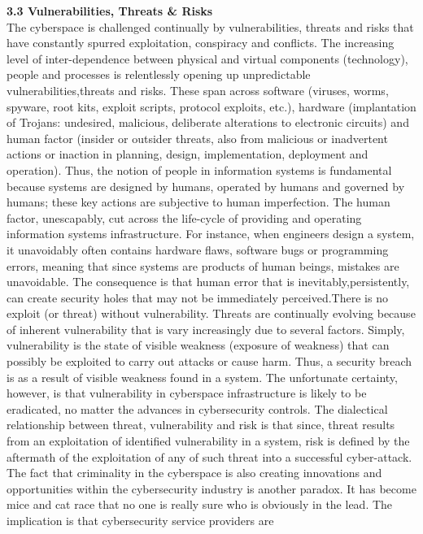 \documentclass[11pt,a4paper]{article}
\begin{document}
	
	
\textbf{ 3.3 Vulnerabilities, Threats & Risks}\\
	
	The cyberspace is challenged continually by vulnerabilities, threats and risks that have constantly spurred exploitation, conspiracy and conflicts. The increasing level of inter-dependence between physical and 
virtual components (technology), people and processes is relentlessly opening up unpredictable vulnerabilities,threats and risks. These span across software (viruses, worms, spyware, root kits, exploit scripts, protocol 
exploits, etc.), hardware (implantation of Trojans: undesired, malicious, deliberate alterations to electronic circuits) and human factor (insider or outsider threats, also from malicious or inadvertent actions or inaction in 
planning, design, implementation, deployment and operation). Thus, the notion of people in information systems is fundamental because systems are designed by humans, operated by humans and governed by humans; these key actions are subjective to human imperfection. The human factor, unescapably, cut across the life-cycle of providing and operating information systems infrastructure. For instance, when engineers design a system, it unavoidably often contains hardware flaws, software bugs or programming errors, meaning that since systems 
are products of human beings, mistakes are unavoidable. The consequence is that human error that is inevitably,persistently, can create security holes that may not be immediately perceived.There is no exploit (or threat) without vulnerability. Threats are continually evolving because of inherent vulnerability that is vary increasingly due to several factors. Simply, vulnerability is the state of visible weakness (exposure of weakness) that can possibly be exploited to carry out attacks or cause harm. Thus, a security breach is as a result of visible weakness found in a system. The unfortunate certainty, however, is that 
vulnerability in cyberspace infrastructure is likely to be eradicated, no matter the advances in cybersecurity controls. The dialectical relationship between threat, vulnerability and risk is that since, threat results from an 
exploitation of identified vulnerability in a system, risk is defined by the aftermath of the exploitation of any of such threat into a successful cyber-attack. The fact that criminality in the cyberspace is also creating innovations 
and opportunities within the cybersecurity industry is another paradox. It has become mice and cat race that no one is really sure who is obviously in the lead. The implication is that cybersecurity service providers are 
\end{document}
